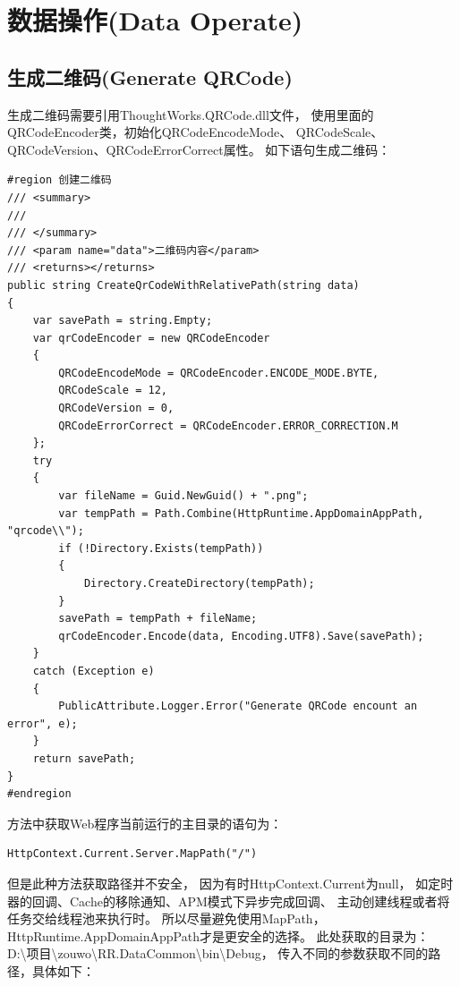 \documentclass{book}
\begin{document}
\chapter{数据操作(Data Operate)}

\clearpage
\mbox{}         
\clearpage

\section{生成二维码(Generate QRCode)}

生成二维码需要引用ThoughtWorks.QRCode.dll文件，
使用里面的QRCodeEncoder类，初始化QRCodeEncodeMode、
QRCodeScale、QRCodeVersion、QRCodeErrorCorrect属性。
如下语句生成二维码：

\begin{lstlisting}[language={[Sharp]C},caption=生成二维码]
#region 创建二维码
/// <summary>
/// 
/// </summary>
/// <param name="data">二维码内容</param>
/// <returns></returns>
public string CreateQrCodeWithRelativePath(string data)
{
    var savePath = string.Empty;
    var qrCodeEncoder = new QRCodeEncoder
    {
        QRCodeEncodeMode = QRCodeEncoder.ENCODE_MODE.BYTE,
        QRCodeScale = 12,
        QRCodeVersion = 0,
        QRCodeErrorCorrect = QRCodeEncoder.ERROR_CORRECTION.M
    };
    try
    {
        var fileName = Guid.NewGuid() + ".png";
        var tempPath = Path.Combine(HttpRuntime.AppDomainAppPath, "qrcode\\");
        if (!Directory.Exists(tempPath))
        {
            Directory.CreateDirectory(tempPath);
        }
        savePath = tempPath + fileName;
        qrCodeEncoder.Encode(data, Encoding.UTF8).Save(savePath);
    }
    catch (Exception e)
    {
        PublicAttribute.Logger.Error("Generate QRCode encount an error", e);
    }
    return savePath;
}
#endregion
\end{lstlisting}

方法中获取Web程序当前运行的主目录的语句为：

\begin{lstlisting}
HttpContext.Current.Server.MapPath("/")
\end{lstlisting}

但是此种方法获取路径并不安全，
因为有时HttpContext.Current为null，
如定时器的回调、Cache的移除通知、APM模式下异步完成回调、
主动创建线程或者将任务交给线程池来执行时。
所以尽量避免使用MapPath，HttpRuntime.AppDomainAppPath才是更安全的选择。
此处获取的目录为：D:\textbackslash 项目\textbackslash zouwo\textbackslash RR.DataCommon\textbackslash bin\textbackslash Debug，
传入不同的参数获取不同的路径，具体如下：
\end{document}
